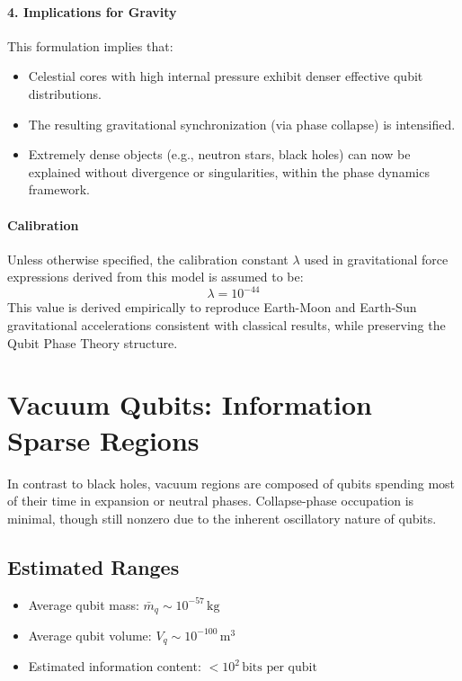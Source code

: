 \documentclass[12pt]{report} %
\begin{document}
\paragraph{4. Implications for Gravity}
This formulation implies that:
\begin{itemize}
  \item Celestial cores with high internal pressure exhibit denser effective qubit distributions.
  \item The resulting gravitational synchronization (via phase collapse) is intensified.
  \item Extremely dense objects (e.g., neutron stars, black holes) can now be explained without divergence or singularities, within the phase dynamics framework.
\end{itemize}

\paragraph{Calibration}
Unless otherwise specified, the calibration constant \( \lambda \) used in gravitational force expressions derived from this model is assumed to be:
\[
\lambda = 10^{-44}
\]
This value is derived empirically to reproduce Earth-Moon and Earth-Sun gravitational accelerations consistent with classical results, while preserving the Qubit Phase Theory structure.


\section{Vacuum Qubits: Information Sparse Regions}

In contrast to black holes, vacuum regions are composed of qubits spending most of their time in expansion or neutral phases. Collapse-phase occupation is minimal, though still nonzero due to the inherent oscillatory nature of qubits.

\subsection*{Estimated Ranges}

\begin{itemize}
  \item Average qubit mass: \( \bar{m}_q \sim 10^{-57} \, \text{kg} \)
  \item Average qubit volume: \( V_q \sim 10^{-100} \, \text{m}^3 \)
  \item Estimated information content: \( < 10^2 \, \text{bits per qubit} \)
\end{itemize}
\end{document}
